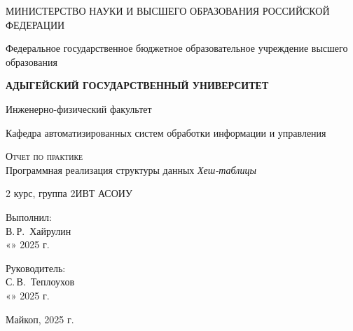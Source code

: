 \documentclass[12pt,a4paper]{scrartcl}
\begin{document}
	\begin{titlepage}
		\begin{center}
			\large
			МИНИСТЕРСТВО НАУКИ И ВЫСШЕГО ОБРАЗОВАНИЯ РОССИЙСКОЙ ФЕДЕРАЦИИ
			
			Федеральное государственное бюджетное образовательное учреждение высшего образования
			
			\textbf{АДЫГЕЙСКИЙ ГОСУДАРСТВЕННЫЙ УНИВЕРСИТЕТ}
			\vspace{0.25cm}
			
			Инженерно-физический факультет
			
			Кафедра автоматизированных систем обработки информации и управления
			\vfill
			
			\textsc{Отчет по практике}\\[5mm]
			
			{\LARGE Программная реализация структуры данных \textit{Хеш-таблицы}}
			\bigskip
			
			2 курс, группа 2ИВТ АСОИУ
		\end{center}
		\vfill
		
		\newlength{\ML}
		\hfill\begin{minipage}{0.5\textwidth}
			Выполнил:\\
			\underline{\hspace{\ML}} В.\,Р.~Хайрулин\\
			«\underline{\hspace{0.7cm}}» \underline{\hspace{2cm}} 2025 г.
		\end{minipage}%
		\bigskip
		
		\hfill\begin{minipage}{0.5\textwidth}
			Руководитель:\\
			\underline{\hspace{\ML}} С.\,В.~Теплоухов\\
			«\underline{\hspace{0.7cm}}» \underline{\hspace{2cm}} 2025 г.
		\end{minipage}%
		\vfill
		
		\begin{center}
			Майкоп, 2025 г.
		\end{center}
	\end{titlepage}

    \newpage
\end{document}

